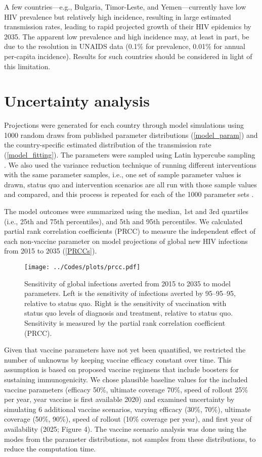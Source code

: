 \documentclass{article}
\begin{document}
A few countries—e.g., Bulgaria, Timor-Leste, and Yemen—currently have
low HIV prevalence but relatively high incidence, resulting in large
estimated transmission rates, leading to rapid projected growth of
their HIV epidemics by 2035. The apparent low prevalence and high
incidence may, at least in part, be due to the resolution in UNAIDS
data (0.1\% for prevalence, 0.01\% for annual per-capita incidence).
Results for such countries should be considered in light of this
limitation.


\section{Uncertainty analysis}
\label{uncertainty}

Projections were generated for each country through model simulations
using 1000 random draws from published parameter distributions
(\autoref{model_param}) and the country-specific estimated
distribution of the transmission rate (\autoref{model_fitting}). The
parameters were sampled using Latin hypercube sampling
\cite{blower1994}.  We also used the variance reduction technique of
running different interventions with the same parameter samples, i.e.,
one set of sample parameter values is drawn, status quo and
intervention scenarios are all run with those sample values and
compared, and this process is repeated for each of the 1000
parameter sets \cite{shechter2006}.

The model outcomes were summarized using the median, 1st and 3rd
quartiles (i.e., 25th and 75th percentiles), and 5th and 95th
percentiles.  We calculated partial rank correlation coefficients
(PRCC) \cite{blower1994} to measure the independent effect of each
non-vaccine parameter on model projections of global new HIV
infections from 2015 to 2035 (\autoref{PRCCs}).

\begin{figure}
  \centering
  \texttt{[image: ../Codes/plots/prcc.pdf]}
  \caption{Sensitivity of global infections averted from 2015 to 2035
    to model parameters.  Left is the sensitivity of infections
    averted by 95--95--95, relative to status quo.  Right is the
    sensitivity of vaccination with status quo levels of diagnosis and
    treatment, relative to status quo.  Sensitivity is measured by the
    partial rank correlation coefficient (PRCC).}
  \label{PRCCs}
\end{figure}

Given that vaccine parameters have not yet been quantified, we
restricted the number of unknowns by keeping vaccine efficacy constant
over time. This assumption is based on proposed vaccine regimens that
include boosters for sustaining immunogenicity. We chose plausible
baseline values for the included vaccine parameters (efficacy 50\%,
ultimate coverage 70\%, speed of rollout 25\% per year, year vaccine
is first available 2020) and examined uncertainty by simulating 6
additional vaccine scenarios, varying efficacy (30\%, 70\%), ultimate
coverage (50\%, 90\%), speed of rollout (10\% coverage per year), and
first year of availability (2025; Figure 4). The vaccine scenario
analysis was done using the modes from the parameter distributions,
not samples from these distributions, to reduce the computation time.
\end{document}
